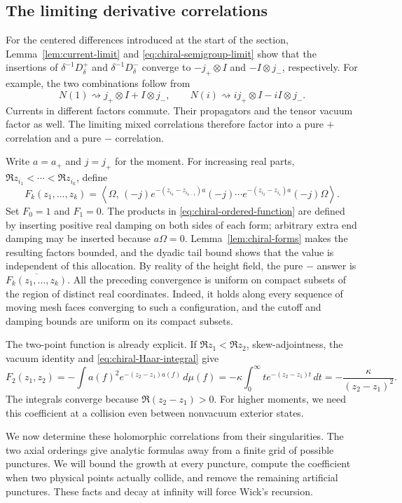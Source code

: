 \subsection{The limiting derivative correlations}

For the centered differences introduced at the start of the section,
Lemma~\ref{lem:current-limit} and
\eqref{eq:chiral-semigroup-limit} show that the insertions of
$\delta^{-1}D_\delta^+$ and $\delta^{-1}D_\delta^-$ converge to
$-j_+\otimes I$ and $-I\otimes j_-$, respectively. For example,
the two combinations follow from
\[
 N(1)\rightsquigarrow j_+\otimes I+I\otimes j_-,
 \qquad
 N(i)\rightsquigarrow i j_+\otimes I-i I\otimes j_-.
\]
Currents in different factors commute. Their propagators and the tensor
vacuum factor as well. The limiting mixed correlations therefore factor
into a pure $+$ correlation and a pure $-$ correlation.

Write $a=a_+$ and $j=j_+$ for the moment. For increasing real parts,
$\Re z_{i_1}<\cdots<\Re z_{i_k}$, define
\begin{equation}\label{eq:chiral-ordered-function}
 F_k(z_1,\ldots,z_k)
 =\left\langle\Omega,\,
 (-j)e^{-(z_{i_k}-z_{i_{k-1}})a}(-j)\cdots
 e^{-(z_{i_2}-z_{i_1})a}(-j)\Omega\right\rangle.
\end{equation}
Set $F_0=1$ and $F_1=0$. The products in
\eqref{eq:chiral-ordered-function} are defined by inserting positive
real damping on both sides of each form; arbitrary extra end damping
may be inserted because $a\Omega=0$. Lemma~\ref{lem:chiral-forms}
makes the resulting factors bounded, and the dyadic tail bound shows
that the value is independent of this allocation. By reality of the
height field, the pure $-$ answer is $\overline{F_k(z_1,\ldots,z_k)}$.
All the preceding convergence is uniform on compact subsets of the
region of distinct real coordinates. Indeed, it holds along every
sequence of moving mesh faces converging to such a configuration,
and the cutoff and damping bounds are uniform on its compact subsets.

The two-point function is already explicit. If $\Re z_1<\Re z_2$,
skew-adjointness, the vacuum identity and
\eqref{eq:chiral-Haar-integral} give
\[
 F_2(z_1,z_2)
 =-\int a(f)^2e^{-(z_2-z_1)a(f)}\,d\mu(f)
 =-\kappa\int_0^\infty t e^{-(z_2-z_1)t}\,dt
 =-\frac{\kappa}{(z_2-z_1)^2}.
\]
The integrals converge because $\Re(z_2-z_1)>0$.
For higher moments, we need this coefficient at a collision even between
nonvacuum exterior states.

We now determine these holomorphic correlations from their singularities.
The two axial orderings give analytic formulas away from a finite grid of
possible punctures. We will bound the growth at every puncture, compute the
coefficient when two physical points actually collide, and remove the
remaining artificial punctures. These facts and decay at infinity will
force Wick's recursion.

